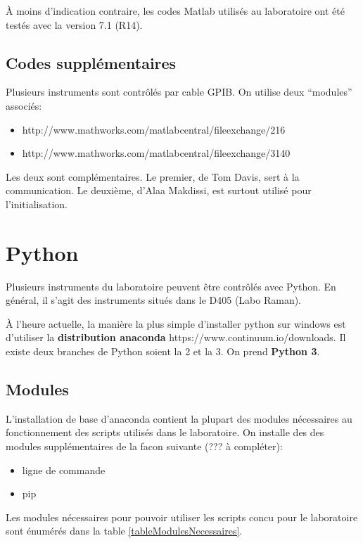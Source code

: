 \documentclass[11pt,francais]{book} %
\begin{document}
À moins d'indication contraire, les codes Matlab utilisés au laboratoire ont été testés avec la version 7.1 (R14).

\subsection{Codes supplémentaires}

Plusieurs instruments sont contrôlés par cable GPIB.
On utilise deux ``modules'' associés:
\begin{itemize}
\item http://www.mathworks.com/matlabcentral/fileexchange/216
\item http://www.mathworks.com/matlabcentral/fileexchange/3140
\label{tableModulesGPIBMatlab}
\end{itemize}
Les deux sont complémentaires.
Le premier, de Tom Davis, sert à la communication.
Le deuxième, d'Alaa Makdissi, est surtout utilisé pour l'initialisation.

\section{Python}

Plusieurs instruments du laboratoire peuvent être contrôlés avec Python.
En général, il s'agit des instruments situés dans le D405 (Labo Raman).

À l'heure actuelle, la manière la plus simple d'installer python sur windows est d'utiliser la {\bf distribution anaconda} https://www.continuum.io/downloads.
Il existe deux branches de Python soient la 2 et la 3. On prend {\bf Python 3}.

\subsection{Modules}

L'installation de base d'anaconda contient la plupart des modules nécessaires au fonctionnement des scripts utilisés dans le laboratoire.
On installe des des modules supplémentaires de la facon suivante (??? à compléter):
\begin{itemize}
\item ligne de commande
\item pip
\end{itemize}

Les modules nécessaires pour pouvoir utiliser les scripts concu pour le laboratoire sont énumérés dans la table \ref{tableModulesNecessaires}.
\end{document}
